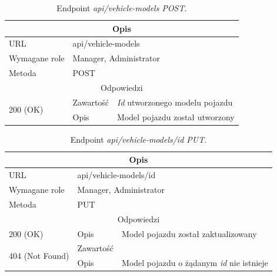 \documentclass[eng,printmode,openany]{mgr}
\begin{document}
	\begin{table}[H]
		\caption{Endpoint \textit{api/vehicle-models POST}.}
		\begin{tabularx}{\textwidth}{|l|l|X|}
			\hline
			\multicolumn{3}{|c|}{Opis}
			\\ \hline
			URL                       & \multicolumn{2}{l|}{api/vehicle-models}
			\\ \hline
			Wymagane role             & \multicolumn{2}{l|}{Manager, Administrator}
			\\ \hline
			Metoda                    & \multicolumn{2}{l|}{POST}
			\\ \hline
			\multicolumn{3}{|c|}{Odpowiedzi}
			\\ \hline
			\multirow{2}{*}{200 (OK)} 		& Zawartość     & \textit{Id} utworzonego modelu pojazdu
			\\ \cline{2-3}                  & Opis         	& Model pojazdu został utworzony
			\\ \hline
		\end{tabularx}
	\end{table}
	
	\begin{table}[H]
		\caption{Endpoint \textit{api/vehicle-models/id PUT}.}
		\begin{tabularx}{\textwidth}{|l|l|X|}
			\hline
			\multicolumn{3}{|c|}{Opis}
			\\ \hline
			URL                       & \multicolumn{2}{l|}{api/vehicle-models/id}
			\\ \hline
			Wymagane role             & \multicolumn{2}{l|}{Manager, Administrator}
			\\ \hline
			Metoda                    & \multicolumn{2}{l|}{PUT}
			\\ \hline
			\multicolumn{3}{|c|}{Odpowiedzi}
			\\ \hline
			200 (OK) 		 & Opis      	& Model pojazdu został zaktualizowany
			\\ \hline
			\multirow{2}{*}{404 (Not Found)} 	    & Zawartość     &   
			\\ \cline{2-3}                          & Opis          & Model pojazdu o żądanym \textit{id} nie istnieje
			\\ \hline
		\end{tabularx}
	\end{table}
	
\end{document}
